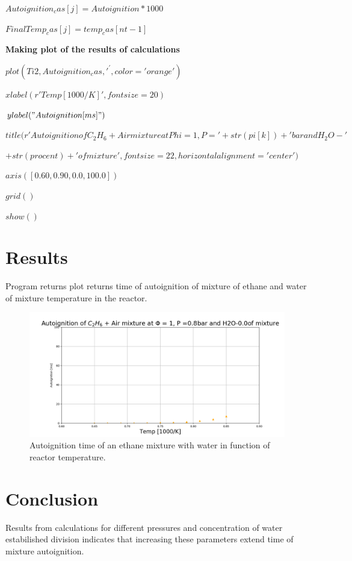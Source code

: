 \documentclass[a4paper]{article}
\begin{document}
\hspace{16,05mm}$Autoignition_cas[j] = Autoignition * 1000  $

\hspace{16,05mm}$FinalTemp_cas[j] = temp_cas[nt - 1]$

\textbf{Making plot of the results of calculations}

\hspace{10,70mm}$plot(Ti2, Autoignition_cas, '^', color='orange')$

\hspace{10,70mm}$xlabel(r'Temp [1000/K]', fontsize=20)$

\hspace{10,70mm}$ylabel("Autoignition [ms]")$

\hspace{10,70mm}$title(r'Autoignition of C_{2}H_{6} + Air mixture at Phi = 1, P ='+ str(pi[k]) +'bar and H_{2}O-'$

\hspace{10,70mm}$+str(procent)+'of mixture', fontsize=22,horizontalalignment='center')$

\hspace{10,70mm}$axis([0.60, 0.90, 0.0, 100.0])$

\hspace{10,70mm}$grid()$

\hspace{10,70mm}$show()$

\section{Results}
Program returns plot returns time of autoignition of mixture of ethane and water of mixture temperature in the reactor.

\begin{figure}

\includegraphics[width=1\textwidth]{przyk_ad.png}
\caption{\label{fig:1}Autoignition time of an ethane mixture with water in function of reactor temperature.}
\end{figure}



\section{Conclusion}
Results from calculations for different pressures and concentration of water estabilished division indicates that increasing these parameters extend time of mixture autoignition.
\end{document}
